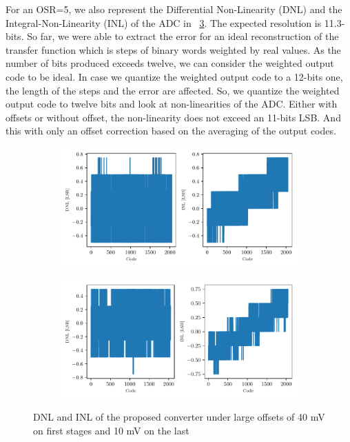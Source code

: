 For an OSR=5, we also represent the Differential Non-Linearity (DNL) and the Integral-Non-Linearity (INL) of the ADC in \figurename~\ref{fig:adc-osr-dnl-inl}. The expected resolution is 11.3-bits. So far, we were able to extract the error for an ideal reconstruction of the transfer function which is steps of binary words weighted by real values. As the number of bits produced exceeds twelve, we can consider the weighted output code to be ideal. In case we quantize the weighted output code to a 12-bits one, the length of the steps and the error are affected. So, we quantize the weighted output code to twelve bits and look at non-linearities of the ADC\@. Either with offsets or without offset, the non-linearity does not exceed an 11-bits LSB\@. And this with only an offset correction based on the averaging of the output codes.

\begin{figure}[htp]
	\centering
	\begin{subfigure}[b]{0.8\textwidth}
		\centering
		\includegraphics[width=\textwidth]{Chapter4/Figs/results/adc/dnl-inl-osr5.pdf}
		\label{fig:adc-osr5-error-offset}
	\end{subfigure}
	\begin{subfigure}[b]{0.8\textwidth}
		\centering
		\includegraphics[width=\textwidth]{Chapter4/Figs/results/adc/dnl-inl-osr5-40mV-40mV-10mV.pdf}
		\label{fig:adc-osr6-error-offset}
	\end{subfigure}
	\caption{DNL and INL of the proposed converter under large offsets of 40 mV on first stages and 10 mV on the last}
	\label{fig:adc-osr-dnl-inl}
\end{figure}

